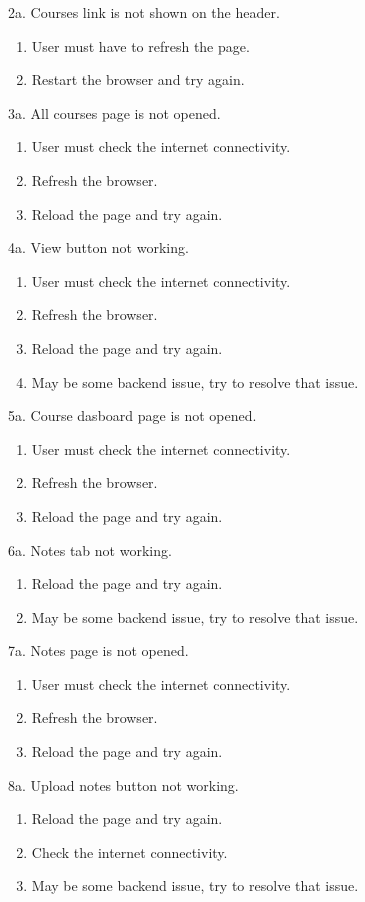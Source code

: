\documentclass[12pt]{article}
\begin{document}
2a. Courses link is not shown on the header.
\begin{enumerate}
\item User must have to refresh the page.
\item Restart the browser and try again.
\end{enumerate} 
3a. All courses page is not opened.
\begin{enumerate}
\item User must check the internet connectivity.
\item Refresh the browser.
\item Reload the page and try again.
\end{enumerate}
4a. View button not working.
\begin{enumerate}
\item User must check the internet connectivity.
\item Refresh the browser.
\item Reload the page and try again.
\item May be some backend issue, try to resolve that issue.
\end{enumerate}
5a. Course dasboard page is not opened.
\begin{enumerate}
\item User must check the internet connectivity.
\item Refresh the browser.
\item Reload the page and try again.
\end{enumerate}
6a. Notes tab not working.
\begin{enumerate}
\item Reload the page and try again.
\item May be some backend issue, try to resolve that issue.
\end{enumerate}
7a. Notes page is not opened.
\begin{enumerate}
\item User must check the internet connectivity.
\item Refresh the browser.
\item Reload the page and try again.
\end{enumerate}
8a. Upload notes button not working.
\begin{enumerate}
\item Reload the page and try again.
\item Check the internet connectivity.
\item May be some backend issue, try to resolve that issue.
\end{enumerate}
\end{document}
